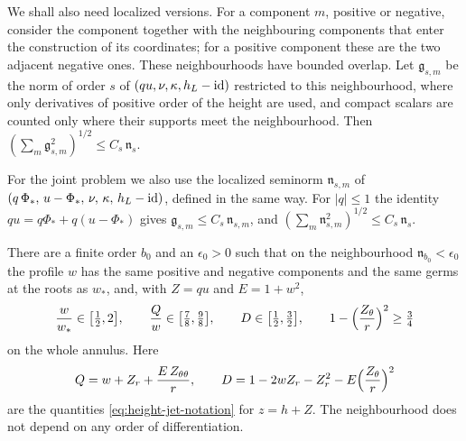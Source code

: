 We shall also need localized versions. For a component $m$, positive
or negative, consider the component together with the neighbouring
components that enter the construction of its coordinates; for a
positive component these are the two adjacent negative ones. These
neighbourhoods have bounded overlap. Let $\mathfrak g_{s,m}$ be the
norm of order $s$ of $(qu,\nu,\kappa,h_L-\mathrm{id})$ restricted to this
neighbourhood, where only derivatives of positive order of the height
are used, and compact scalars are counted only where their supports
meet the neighbourhood. Then
$(\sum_m\mathfrak g_{s,m}^2)^{1/2}\le C_s\,\mathfrak n_s$.

For the joint problem we also use the localized seminorm
$\mathfrak n_{s,m}$ of
$(q\,\Phi_*,\,u-\Phi_*,\,\nu,\,\kappa,\,h_L-\mathrm{id})$, defined in the
same way. For $|q|\le1$ the identity $qu=q\Phi_*+q(u-\Phi_*)$ gives
$\mathfrak g_{s,m}\le C_s\,\mathfrak n_{s,m}$, and
$(\sum_m\mathfrak n_{s,m}^2)^{1/2}\le C_s\,\mathfrak n_s$.

\begin{lemma}
\label{lem:common-geometric-neighborhood}
There are a finite order $b_0$ and an $\epsilon_0>0$ such that on the
neighbourhood $\mathfrak n_{b_0}<\epsilon_0$ the profile $w$ has the
same positive and negative components and the same germs at the roots
as $w_*$, and, with $Z=qu$ and $E=1+w^2$,
\[
 \frac{w}{w_*}\in\bigl[\tfrac12,2\bigr],\qquad
 \frac Qw\in\bigl[\tfrac78,\tfrac98\bigr],\qquad
 D\in\bigl[\tfrac12,\tfrac32\bigr],\qquad
 1-\Bigl(\frac{Z_\theta}{r}\Bigr)^2\ge\tfrac34
\]
on the whole annulus. Here
\begin{equation}\label{eq:geometry-low-QD}
 Q=w+Z_r+\frac{E\,Z_{\theta\theta}}r,\qquad
 D=1-2wZ_r-Z_r^2-E\Bigl(\frac{Z_\theta}r\Bigr)^2
\end{equation}
are the quantities \eqref{eq:height-jet-notation} for $z=h+Z$. The
neighbourhood does not depend on any order of differentiation.
\end{lemma}

